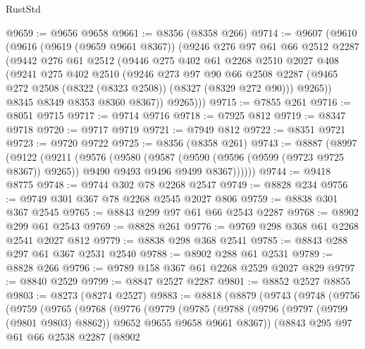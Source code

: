 \begin{lexlean}{RustStd}
\begin{coremodule}
{\begin{coremodule}
{{{{{{{{{{{{{{{{{{{{{{{{{{{{{{{{{{{{{{{{{{{{{{{{{{{{{{@9659 := @9656 @9658
@9661 := @8356 (@8358 @266)
@9714 := @9607
    (@9610
      (@9616
        (@9619 (@9659 @9661 @8367))
        (@9246
          @276
          @97
          @61
          @66
          @2512
          @2287
          (@9442
            @276
            @61
            @2512
            (@9446
              @275
              @402
              @61
              @2268
              @2510
              @2027
              @408
              (@9241
                @275
                @402
                @2510
                (@9246
                  @273
                  @97
                  @90
                  @66
                  @2508
                  @2287
                  (@9465 @272 @2508 (@8322 (@8323 @2508)) (@8327 (@8329 @272 @90)))
                  @9265))
              @8345
              @8349
              @8353
              @8360
              @8367))
          @9265)))
@9715 := @7855 @261
@9716 := @8051 @9715
@9717 := @9714 @9716
@9718 := @7925 @812
@9719 := @8347 @9718
@9720 := @9717 @9719
@9721 := @7949 @812
@9722 := @8351 @9721
@9723 := @9720 @9722
@9725 := @8356 (@8358 @261)
@9743 := @8887
    (@8997
      (@9122
        (@9211
          (@9576
            (@9580
              (@9587
                (@9590 (@9596 (@9599 (@9723 @9725 @8367)) @9265))
                @9490
                @9493
                @9496
                @9499
                @8367))))))
@9744 := @9418 @8775
@9748 := @9744 @302 @78 @2268 @2547
@9749 := @8828 @234
@9756 := @9749 @301 @367 @78 @2268 @2545 @2027 @806
@9759 := @8838 @301 @367 @2545
@9765 := @8843 @299 @97 @61 @66 @2543 @2287
@9768 := @8902 @299 @61 @2543
@9769 := @8828 @261
@9776 := @9769 @298 @368 @61 @2268 @2541 @2027 @812
@9779 := @8838 @298 @368 @2541
@9785 := @8843 @288 @297 @61 @367 @2531 @2540
@9788 := @8902 @288 @61 @2531
@9789 := @8828 @266
@9796 := @9789 @158 @367 @61 @2268 @2529 @2027 @829
@9797 := @8840 @2529
@9799 := @8847 @2527 @2287
@9801 := @8852 @2527 @8855
@9803 := @8273 (@8274 @2527)
@9883 := @8818
    (@8879
      (@9743
        (@9748
          (@9756
            (@9759
              (@9765
                (@9768
                  (@9776
                    (@9779
                      (@9785
                        (@9788
                          (@9796 (@9797 (@9799 (@9801 @9803) @8862)) @9652 @9655 @9658 @9661 @8367))
                        (@8843
                          @295
                          @97
                          @61
                          @66
                          @2538
                          @2287
                          (@8902
}}}}}}}}}}}}}}}}}}}}}}}}}}}}}}}}}}}}}}}}}}}}}}}}}}}}}}
\end{coremodule}}
\end{coremodule}
\end{lexlean}
